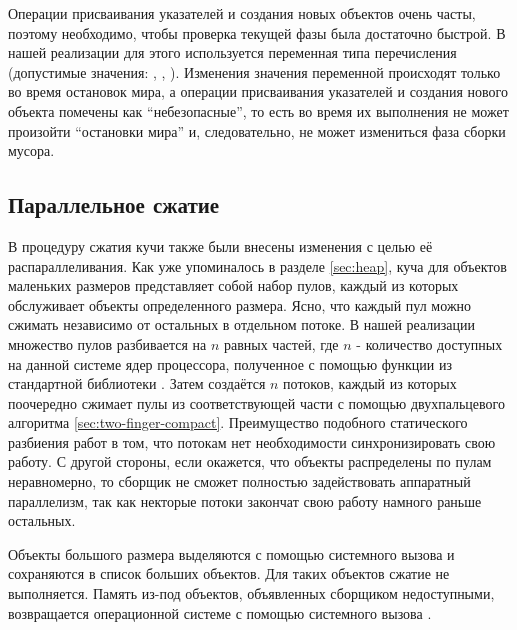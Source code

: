 Операции присваивания указателей и создания новых объектов очень часты, 
поэтому необходимо, чтобы проверка текущей фазы была достаточно быстрой. 
В нашей реализации для этого используется переменная  типа 
перечисления (допустимые значения: , , ). 
Изменения значения переменной  происходят только во время остановок мира, 
а операции присваивания указателей и создания нового объекта помечены как ``небезопасные'', 
то есть во время их выполнения не может произойти ``остановки мира'' и, следовательно, 
не может измениться фаза сборки мусора.


\subsection{Параллельное сжатие}
В процедуру сжатия кучи также были внесены изменения с целью её распараллеливания. 
Как уже упоминалось в разделе \ref{sec:heap}, куча для объектов маленьких размеров 
представляет собой набор пулов, каждый из которых обслуживает объекты определенного размера. 
Ясно, что каждый пул можно сжимать независимо от остальных в отдельном потоке. 
В нашей реализации множество пулов разбивается на $n$ равных частей, 
где $n$ - количество доступных на данной системе ядер процессора, 
полученное с помощью функции из стандартной библиотеки 
. 
Затем создаётся $n$ потоков, каждый из которых поочередно сжимает пулы из 
соответствующей части с помощью двухпальцевого алгоритма \ref{sec:two-finger-compact}. 
Преимущество подобного статического разбиения работ в том, что потокам нет необходимости 
синхронизировать свою работу. 
С другой стороны, если окажется, что объекты распределены по пулам неравномерно, 
то сборщик не сможет полностью задействовать аппаратный параллелизм, так как некторые 
потоки закончат свою работу намного раньше остальных. 

Объекты большого размера выделяются с помощью системного вызова  и 
сохраняются в список больших объектов. 
Для таких объектов сжатие не выполняется. 
Память из-под объектов, объявленных сборщиком недоступными, возвращается операционной 
системе с помощью системного вызова .
